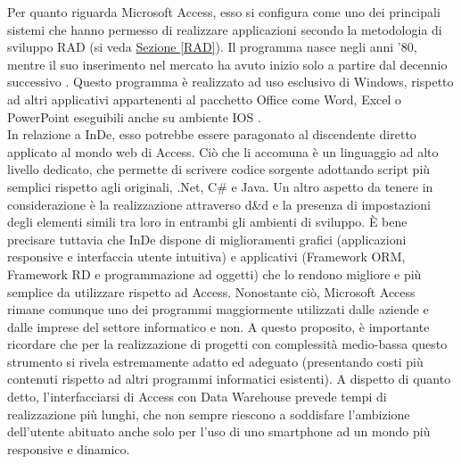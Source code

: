 Per quanto riguarda Microsoft Access, esso si configura come uno dei principali sistemi che hanno permesso di realizzare applicazioni secondo la metodologia di sviluppo RAD (si veda \hyperref[RAD]{Sezione \ref{RAD}}). Il programma nasce negli anni '80, mentre il suo inserimento nel mercato ha avuto inizio solo a partire dal decennio successivo \hyperref[bib20]{\cite{[20]}}.
Questo programma è realizzato ad uso esclusivo di Windows, rispetto ad altri applicativi appartenenti al pacchetto Office come Word, Excel o PowerPoint eseguibili anche su ambiente IOS \hyperref[bib20]{\cite{[20]}}.\\
In relazione a InDe, esso potrebbe essere paragonato al discendente diretto applicato al mondo web di Access. Ciò che li accomuna è un linguaggio ad alto livello dedicato, che permette di scrivere codice sorgente adottando script più semplici rispetto agli originali, .Net, C\# e Java. Un altro aspetto da tenere in considerazione è la realizzazione attraverso d\&d e la presenza di impostazioni degli elementi simili tra loro in entrambi gli ambienti di sviluppo.
È bene precisare tuttavia che InDe dispone di miglioramenti grafici (applicazioni responsive e interfaccia utente intuitiva)  e applicativi (Framework ORM, Framework RD e programmazione ad oggetti) che lo rendono migliore e più semplice da utilizzare rispetto ad Access.
Nonostante ciò, Microsoft Access rimane comunque uno dei programmi maggiormente utilizzati dalle aziende e dalle imprese del settore informatico e non.
A questo proposito, è importante ricordare che per la realizzazione di progetti con complessità medio-bassa questo strumento si rivela estremamente adatto ed adeguato (presentando costi più contenuti rispetto ad altri programmi informatici esistenti).
A dispetto di quanto detto, l'interfacciarsi di Access con Data Warehouse prevede tempi di realizzazione più lunghi, che non sempre riescono a soddisfare l'ambizione dell'utente abituato anche solo per l'uso di uno smartphone ad un mondo più responsive e dinamico. 


